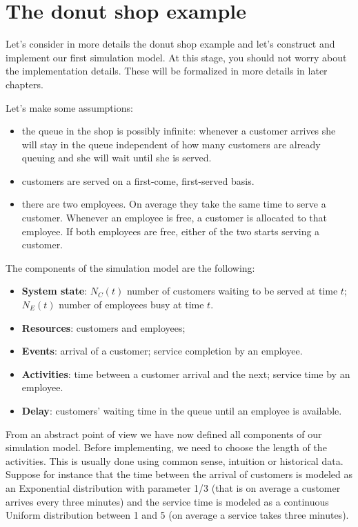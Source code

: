 \documentclass[
]{book}
\theoremstyle{definition}
\theoremstyle{definition}
\theoremstyle{definition}
\theoremstyle{definition}
\theoremstyle{remark}
\begin{document}
\hypertarget{the-donut-shop-example}{%
\section{The donut shop example}\label{the-donut-shop-example}}

Let's consider in more details the donut shop example and let's construct and implement our first simulation model. At this stage, you should not worry about the implementation details. These will be formalized in more details in later chapters.

Let's make some assumptions:

\begin{itemize}
\item
  the queue in the shop is possibly infinite: whenever a customer arrives she will stay in the queue independent of how many customers are already queuing and she will wait until she is served.
\item
  customers are served on a first-come, first-served basis.
\item
  there are two employees. On average they take the same time to serve a customer. Whenever an employee is free, a customer is allocated to that employee. If both employees are free, either of the two starts serving a customer.
\end{itemize}

The components of the simulation model are the following:

\begin{itemize}
\item
  \textbf{System state}: \(N_C(t)\) number of customers waiting to be served at time \(t\); \(N_E(t)\) number of employees busy at time \(t\).
\item
  \textbf{Resources}: customers and employees;
\item
  \textbf{Events}: arrival of a customer; service completion by an employee.
\item
  \textbf{Activities}: time between a customer arrival and the next; service time by an employee.
\item
  \textbf{Delay}: customers' waiting time in the queue until an employee is available.
\end{itemize}

From an abstract point of view we have now defined all components of our simulation model. Before implementing, we need to choose the length of the activities. This is usually done using common sense, intuition or historical data. Suppose for instance that the time between the arrival of customers is modeled as an Exponential distribution with parameter 1/3 (that is on average a customer arrives every three minutes) and the service time is modeled as a continuous Uniform distribution between 1 and 5 (on average a service takes three minutes).
\end{document}
